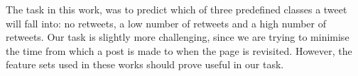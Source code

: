 
The task in this work, was to predict which of three predefined classes a tweet 
will fall into: no retweets, a low number of retweets and a high number of retweets. 
Our task is slightly more challenging, 
since we are trying to minimise the time from which a post is made to when the 
page is revisited. However, the feature sets used in these works should prove 
useful in our task.  

%
%

